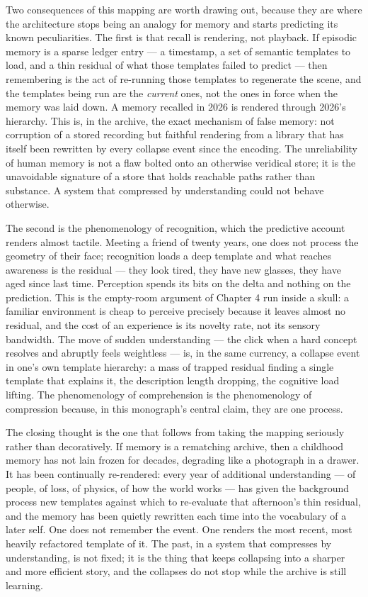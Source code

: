 \documentclass[11pt,oneside]{book}
\theoremstyle{remark}
\begin{document}
Two consequences of this mapping are worth drawing out, because they
are where the architecture stops being an analogy for memory and starts
predicting its known peculiarities. The first is that recall is
rendering, not playback. If episodic memory is a sparse ledger entry
--- a timestamp, a set of semantic templates to load, and a thin
residual of what those templates failed to predict --- then remembering
is the act of re-running those templates to regenerate the scene, and
the templates being run are the \emph{current} ones, not the ones in
force when the memory was laid down. A memory recalled in 2026 is
rendered through 2026's hierarchy. This is, in the archive, the exact
mechanism of false memory: not corruption of a stored recording but
faithful rendering from a library that has itself been rewritten by
every collapse event since the encoding. The unreliability of human
memory is not a flaw bolted onto an otherwise veridical store; it is the
unavoidable signature of a store that holds reachable paths rather than
substance. A system that compressed by understanding could not behave
otherwise.

The second is the phenomenology of recognition, which the predictive
account renders almost tactile. Meeting a friend of twenty years, one
does not process the geometry of their face; recognition loads a deep
template and what reaches awareness is the residual --- they look tired,
they have new glasses, they have aged since last time. Perception
spends its bits on the delta and nothing on the prediction. This is the
empty-room argument of Chapter 4 run inside a skull: a familiar
environment is cheap to perceive precisely because it leaves almost no
residual, and the cost of an experience is its novelty rate, not its
sensory bandwidth. The move of sudden understanding --- the click when
a hard concept resolves and abruptly feels weightless --- is, in the
same currency, a collapse event in one's own template hierarchy: a mass
of trapped residual finding a single template that explains it, the
description length dropping, the cognitive load lifting. The
phenomenology of comprehension is the phenomenology of compression
because, in this monograph's central claim, they are one process.

The closing thought is the one that follows from taking the mapping
seriously rather than decoratively. If memory is a rematching archive,
then a childhood memory has not lain frozen for decades, degrading like
a photograph in a drawer. It has been continually re-rendered: every
year of additional understanding --- of people, of loss, of physics, of
how the world works --- has given the background process new templates
against which to re-evaluate that afternoon's thin residual, and the
memory has been quietly rewritten each time into the vocabulary of a
later self. One does not remember the event. One renders the most
recent, most heavily refactored template of it. The past, in a system
that compresses by understanding, is not fixed; it is the thing that
keeps collapsing into a sharper and more efficient story, and the
collapses do not stop while the archive is still learning.
\end{document}

